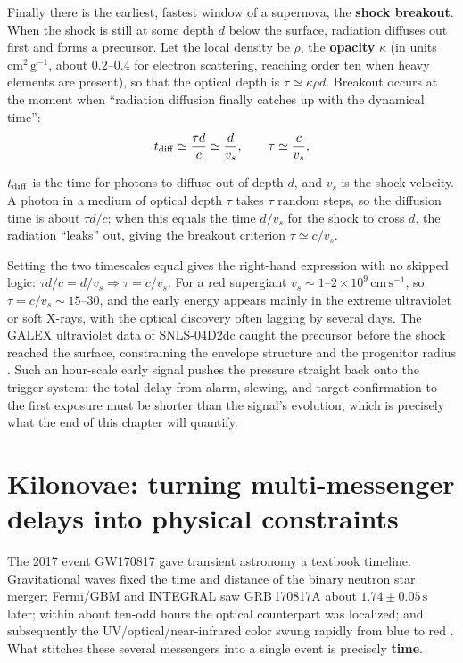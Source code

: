 Finally there is the earliest, fastest window of a supernova, the \textbf{shock breakout}. When the shock is still at some depth \(d\) below the surface, radiation diffuses out first and forms a precursor. Let the local density be \(\rho\), the \textbf{opacity} \(\kappa\) (in units \(\mathrm{cm^2\,g^{-1}}\), about \(0.2\text{--}0.4\) for electron scattering, reaching order ten when heavy elements are present), so that the optical depth is \(\tau\simeq\kappa\rho d\). Breakout occurs at the moment when ``radiation diffusion finally catches up with the dynamical time'':
\begin{equation}
  t_{\rm diff}\simeq \frac{\tau d}{c}\simeq \frac{d}{v_s},
  \qquad
  \tau\simeq \frac{c}{v_s},
  \label{eq:e20-shock-breakout-condition}
\end{equation}
\begin{formulaexplain}
\(t_{\rm diff}\) is the time for photons to diffuse out of depth \(d\), and \(v_s\) is the shock velocity. A photon in a medium of optical depth \(\tau\) takes \(\tau\) random steps, so the diffusion time is about \(\tau d/c\); when this equals the time \(d/v_s\) for the shock to cross \(d\), the radiation ``leaks'' out, giving the breakout criterion \(\tau\simeq c/v_s\).
\end{formulaexplain}
Setting the two timescales equal gives the right-hand expression with no skipped logic: \(\tau d/c = d/v_s\Rightarrow\tau=c/v_s\). For a red supergiant \(v_s\sim1\text{--}2\times10^9\,\mathrm{cm\,s^{-1}}\), so \(\tau=c/v_s\sim15\text{--}30\), and the early energy appears mainly in the extreme ultraviolet or soft X-rays, with the optical discovery often lagging by several days. The GALEX ultraviolet data of SNLS-04D2dc caught the precursor before the shock reached the surface, constraining the envelope structure and the progenitor radius \citep{2008Sci...321..223S,2011ApJ...727..104C}. Such an hour-scale early signal pushes the pressure straight back onto the trigger system: the total delay from alarm, slewing, and target confirmation to the first exposure must be shorter than the signal's evolution, which is precisely what the end of this chapter will quantify.

\section{Kilonovae: turning multi-messenger delays into physical constraints}
\label{sec:e20-kilonova}

The 2017 event GW170817 gave transient astronomy a textbook timeline. Gravitational waves fixed the time and distance of the binary neutron star merger; Fermi/GBM and INTEGRAL saw GRB\,170817A about \(1.74\pm0.05\,\mathrm{s}\) later; within about ten-odd hours the optical counterpart was localized; and subsequently the UV/optical/near-infrared color swung rapidly from blue to red \citep{2017PhRvL.119p1101A,2017ApJ...848L..13A,2017ApJ...848L..12A,2017ApJ...848L..17C,2017Natur.551...75S}. What stitches these several messengers into a single event is precisely \textbf{time}.

